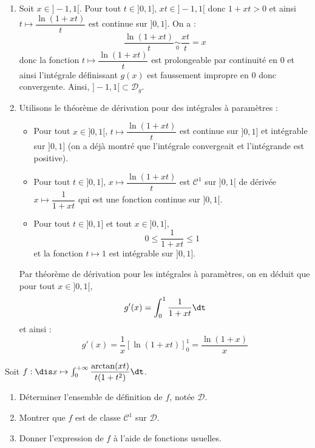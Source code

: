 \documentclass[a4paper,10pt]{report}
\begin{document}
\corr 
\begin{enumerate}
\item Soit $x \in ]-1,1[$. Pour tout $t \in ]0,1]$, $xt \in ]-1,1[$ donc $1+xt >0$ et ainsi $t \mapsto \dfrac{\ln(1+xt)}{t} $ est continue sur $]0,1]$. On a :
$$ \dfrac{\ln(1+xt)}{t}  \underset{0}{\sim} \dfrac{xt}{t}= x$$
donc la fonction $t \mapsto \dfrac{\ln(1+xt)}{t} $ est prolongeable par continuité en $0$ et ainsi l'intégrale définissant $g(x)$ est faussement impropre en $0$ donc convergente. Ainsi, $]-1,1[ \subset \mathcal{D}_g$.

\item Utilisons le théorème de dérivation pour des intégrales à paramètres :
\begin{itemize}
\item Pour tout $x \in ]0,1[$, $t \mapsto \dfrac{\ln(1+xt)}{t}$ est continue sur $]0,1]$ et intégrable sur $]0,1]$ (on a déjà montré que l'intégrale convergeait et l'intégrande est positive).
\item Pour tout $t \in ]0,1]$, $x \mapsto \dfrac{\ln(1+xt)}{t}$ est $\mathcal{C}^1$ sur $]0,1[$ de dérivée $x \mapsto \dfrac{1}{1+xt}$ qui est une fonction continue sur $]0,1[$.
\item Pour tout $t \in ]0,1]$ et tout $x \in ]0,1]$,
$$ 0 \leq \dfrac{1}{1+xt} \leq 1$$
et la fonction $t \mapsto 1$ est intégrable sur $]0,1]$.
\end{itemize}
Par théorème de dérivation pour les intégrales à paramètres, on en déduit que pour tout $x \in ]0,1[$,
$$ g'(x) = \int_{0}^1 \dfrac{1}{1+xt} \dt$$
et ainsi :
$$ g'(x) = \dfrac{1}{x} [ \ln(1+xt) ]_0^1 = \dfrac{\ln(1+x)}{x}$$
\end{enumerate}

\begin{Exercice}{} Soit $f : \dis x \mapsto \int_{0}^{+ \infty} \dfrac{\arctan(xt)}{t(1+t^2)} \dt$.
\begin{enumerate}
\item Déterminer l'ensemble de définition de $f$, notée $\mathcal{D}$.
\item Montrer que $f$ est de classe $\mathcal{C}^1$ sur $\mathcal{D}$.
\item Donner l'expression de $f$ à l'aide de fonctions usuelles.
\end{enumerate}
\end{Exercice}
\end{document}
